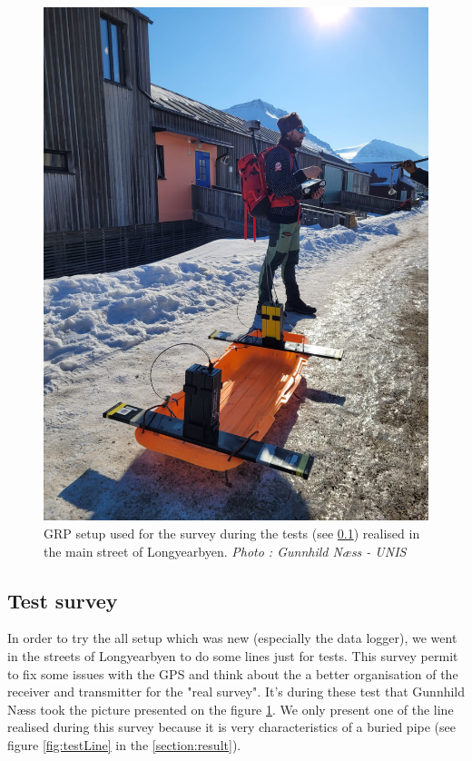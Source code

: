 \begin{figure} [H]
    \centering
    \includegraphics[width=0.7\linewidth]{Images/00_Methodology/PictureGunnhild.jpg}
    \caption{GRP setup used for the survey during the tests (see \ref{Subsection:TestSurvey}) realised in the main street of Longyearbyen. \emph{Photo : Gunnhild Næss - UNIS}}
    \label{fig:PictureGunnhild}
\end{figure}

\subsection{Test survey} \label{Subsection:TestSurvey}

In order to try the all setup which was new (especially the data logger), we went in the streets of Longyearbyen to do some lines just for tests. This survey permit to fix some issues with the GPS and think about the a better organisation of the receiver and transmitter for the "real survey". It's during these test that Gunnhild Næss took the picture presented on the figure \ref{fig:PictureGunnhild}. We only present one of the line realised during this survey because it is very characteristics of a buried pipe (see figure \ref{fig:testLine} in the \ref{section:result}).

